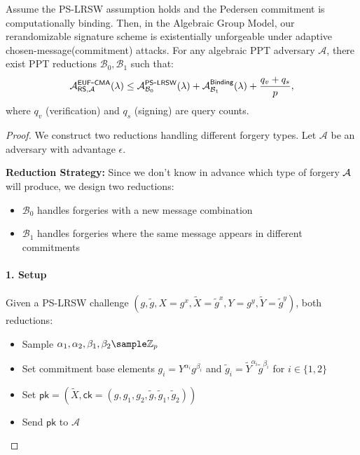 \begin{theorem}
Assume the PS-LRSW assumption holds and the Pedersen commitment is computationally binding. Then, in the Algebraic Group Model, our rerandomizable signature scheme is existentially unforgeable under adaptive chosen-message(commitment) attacks. For any algebraic PPT adversary $\mathcal{A}$, there exist PPT reductions $\mathcal{B}_0, \mathcal{B}_1$ such that:
\[
\mathcal{A}^{\mathsf{EUF\mbox{-}CMA}}_{\mathsf{RS},\mathcal{A}}(\lambda) \leq \mathcal{A}^{\mathsf{PS\mbox{-}LRSW}}_{\mathcal{B}_0}(\lambda) + \mathcal{A}^{\mathsf{Binding}}_{\mathcal{B}_1}(\lambda) + \frac{q_v + q_s}{p},
\]
where $q_v$ (verification) and $q_s$ (signing) are query counts.
\end{theorem}

\begin{proof}
We construct two reductions handling different forgery types. Let $\mathcal{A}$ be an adversary with advantage $\epsilon$.

\textbf{Reduction Strategy: } Since we don't know in advance which type of forgery $\mathcal{A}$ will produce, we design two reductions:
\begin{itemize}
    \item $\mathcal{B}_0$ handles forgeries with a new message combination
    \item $\mathcal{B}_1$ handles forgeries where the same message appears in different commitments
\end{itemize}

\paragraph{1. Setup}
Given a PS-LRSW challenge $(g, \tilde{g}, X=g^x, \tilde{X}=\tilde{g}^x, Y=g^y, \tilde{Y}=\tilde{g}^y)$, both reductions:
\begin{itemize}
    \item Sample $\alpha_1, \alpha_2, \beta_1, \beta_2 \sample \Z_p$ 
    \item Set commitment base elements $g_i = Y^{\alpha_i}g^{\beta_i}$ and $\tilde{g}_i = \tilde{Y}^{\alpha_i}\tilde{g}^{\beta_i}$ for $i \in \{1,2\}$
    \item Set $\mathsf{pk} = (\tilde{X}, \mathsf{ck} = (g, g_1, g_2, \tilde{g}, \tilde{g}_1, \tilde{g}_2))$
    \item Send $\mathsf{pk}$ to $\mathcal{A}$
\end{itemize}


\end{proof}
